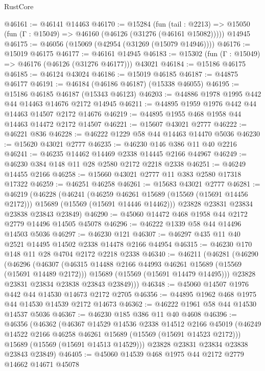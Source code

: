 \begin{lexlean}{RustCore}
\begin{coremodule}
@46161 := @46141 @14463
@46170 := @15284
    (fun (tail : @2213) => @15050 (fun (Γ : @15049) => @46160 (@46126 (@31276 (@46161 @15082)))))
    @14945
@46175 := @46056 (@15069 (@42954 (@31269 (@15079 @14946))))
@46176 := @15019 @46175
@46177 := @46161 @14945
@46183 := @15302 (fun (Γ : @15049) => @46176 (@46126 (@31276 @46177))) @43021
@46184 := @15186 @46175
@46185 := @46124 @43024
@46186 := @15019 @46185
@46187 := @44875 @46177
@46191 := @46184 (@46186 @46187) (@15338 @46055)
@46195 := @15186 @46185 @46187 (@15343 @46123)
@46203 := @44886 @1978 @1995 @442 @44 @14463 @14676 @2172 @14945
@46211 := @44895 @1959 @1976 @442 @44 @14463 @14507 @2172 @14676
@46219 := @44895 @1955 @468 @1958 @44 @14463 @14472 @2172 @14507
@46221 := @15607 @43021 @2777
@46222 := @46221 @836
@46228 := @46222 @1229 @58 @44 @14463 @14470 @5036
@46230 := @15620 @43021 @2777
@46235 := @46230 @146 @386 @11 @40 @2216
@46241 := @46235 @14462 @14469 @2338 @14445 @2166 @44967
@46249 := @46230 @384 @148 @11 @28 @2580 @2172 @2218 @2338
@46251 := @46249 @14455 @2166
@46258 := @15660 @43021 @2777 @11 @383 @2580 @17318 @17322
@46259 := @46251 @46258
@46261 := @15683 @43021 @2777
@46281 := @46219
    (@46228
      (@46241
        (@46259 @46261 @15689 (@15569 (@15691 @14456 @2172)))
        @15689
        (@15569 (@15691 @14446 @14462)))
      @23828
      @23831
      @23834
      @23838
      @23843
      @23849)
@46290 := @45060 @14472 @468 @1958 @44 @2172 @2779 @14496 @14505 @45078
@46296 := @46222 @1339 @58 @44 @14496 @14503 @5036
@46297 := @46230 @121
@46307 := @46297 @435 @11 @40 @2521 @14495 @14502 @2338 @14478 @2166 @44954
@46315 := @46230 @170 @148 @11 @28 @4704 @2172 @2218 @2338
@46340 := @46211
    (@46281
      (@46290
        (@46296
          (@46307
            (@46315 @14488 @2166 @44993 @46261 @15689 (@15569 (@15691 @14489 @2172)))
            @15689
            (@15569 (@15691 @14479 @14495)))
          @23828
          @23831
          @23834
          @23838
          @23843
          @23849)))
@46348 := @45060 @14507 @1976 @442 @44 @14530 @14673 @2172 @2705
@46356 := @44895 @1962 @468 @1975 @44 @14530 @14539 @2172 @14673
@46362 := @46222 @1961 @58 @44 @14530 @14537 @5036
@46367 := @46230 @185 @386 @11 @40 @4608
@46396 := @46356
    (@46362
      (@46367
        @14529
        @14536
        @2338
        @14512
        @2166
        @45019
        (@46249 @14522 @2166 @46258 @46261 @15689 (@15569 (@15691 @14523 @2172)))
        @15689
        (@15569 (@15691 @14513 @14529)))
      @23828
      @23831
      @23834
      @23838
      @23843
      @23849)
@46405 := @45060 @14539 @468 @1975 @44 @2172 @2779 @14662 @14671 @45078

\end{coremodule}
\end{lexlean}
